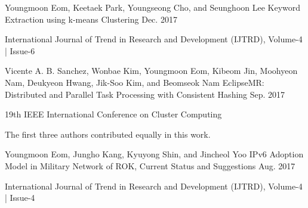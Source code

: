 


\begin{cventries}


\cventry
{Youngmoon Eom, Keetaek Park, Youngseong Cho, and Seunghoon Lee} %
{Keyword Extraction using k-means Clustering} %
{} %
{Dec. 2017} %
{ %
\begin{cvitems}
\item {International Journal of Trend in Research and Development (IJTRD), Volume-4 | Issue-6}
\end{cvitems}
}


\cventry
{Vicente A. B. Sanchez, Wonbae Kim, Youngmoon Eom, Kibeom Jin, Moohyeon Nam, Deukyeon Hwang, Jik-Soo Kim, and Beomseok Nam} %
{EclipseMR: Distributed and Parallel Task Processing with Consistent Hashing} %
{} %
{Sep. 2017} %
{ %
\begin{cvitems}
\item {19th IEEE International Conference on Cluster Computing}
\item {The first three authors contributed equally in this work.}
\end{cvitems}
}


\cventry
{Youngmoon Eom, Jungho Kang, Kyuyong Shin, and Jincheol Yoo} %
{IPv6 Adoption Model in Military Network of ROK, Current Status and Suggestions} %
{} %
{Aug. 2017} %
{ %
\begin{cvitems}
\item {International Journal of Trend in Research and Development (IJTRD), Volume-4 | Issue-4}
\end{cvitems}
}



\end{cventries}
